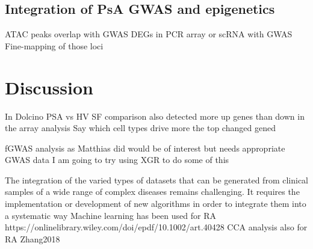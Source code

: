 

\subsection{Integration of PsA GWAS and epigenetics}

ATAC peaks overlap with GWAS
DEGs in PCR array or scRNA with GWAS
Fine-mapping of those loci




\section{Discussion}
%
In Dolcino PSA vs HV SF comparison also detected more up genes than down in the array analysis
Say which cell types drive more the top changed gened

fGWAS analysis as Matthias did would be of interest but needs appropriate GWAS data
I am going to try using XGR to do some of this 



The integration of the varied types of datasets that can be generated from clinical samples of a wide range of complex diseases remains challenging. It requires the implementation or development of new algorithms in order to integrate them into a systematic way
Machine learning has been used for RA https://onlinelibrary.wiley.com/doi/epdf/10.1002/art.40428
CCA analysis also for RA Zhang2018	


